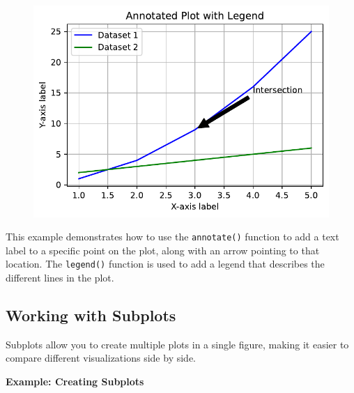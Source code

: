 \documentclass[
  letterpaper,
  DIV=11,
  numbers=noendperiod]{scrreprt}
\begin{document}
\begin{figure}[H]

{\centering \includegraphics{15_Data_Vis_files/figure-pdf/cell-6-output-1.pdf}

}

\end{figure}

This example demonstrates how to use the \texttt{annotate()} function to
add a text label to a specific point on the plot, along with an arrow
pointing to that location. The \texttt{legend()} function is used to add
a legend that describes the different lines in the plot.

\hypertarget{working-with-subplots}{%
\subsection{Working with Subplots}\label{working-with-subplots}}

Subplots allow you to create multiple plots in a single figure, making
it easier to compare different visualizations side by side.

\textbf{Example: Creating Subplots}
\end{document}

